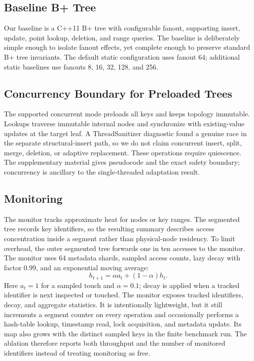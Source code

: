 \documentclass[sigconf,review,anonymous]{acmart}
\begin{document}
\subsection{Baseline B+ Tree}

Our baseline is a C++11 B+ tree with configurable fanout, supporting insert,
update, point lookup, deletion, and range queries.  The baseline is deliberately
simple enough to isolate fanout effects, yet complete enough to preserve
standard B+ tree invariants.  The default static configuration uses fanout 64;
additional static baselines use fanouts 8, 16, 32, 128, and 256.

\subsection{Concurrency Boundary for Preloaded Trees}

The supported concurrent mode preloads all keys and keeps topology immutable.
Lookups traverse immutable internal nodes and synchronize with existing-value
updates at the target leaf.  A ThreadSanitizer diagnostic found a genuine race
in the separate structural-insert path, so we do not claim concurrent insert,
split, merge, deletion, or adaptive replacement.  These operations require
quiescence.  The supplementary material gives pseudocode and the exact safety
boundary; concurrency is ancillary to the single-threaded adaptation result.

\subsection{Monitoring}

The monitor tracks approximate heat for nodes or key ranges.  The segmented
tree records key identifiers, so the resulting summary describes access
concentration inside a segment rather than physical-node residency.  To limit
overhead, the outer segmented tree forwards one in ten accesses to the
monitor.  The monitor uses 64 metadata shards, sampled access counts, lazy
decay with factor 0.99, and an exponential moving average:
\[
  h_{t+1} = \alpha a_t + (1-\alpha)h_t.
\]
Here \(a_t=1\) for a sampled touch and \(\alpha=0.1\); decay is applied when a
tracked identifier is next inspected or touched.  The monitor exposes tracked
identifiers, decay, and aggregate statistics.  It is intentionally
lightweight, but it still increments a segment counter on every operation and
occasionally performs a hash-table lookup, timestamp read, lock acquisition,
and metadata update.  Its map also grows with the distinct sampled keys in the
finite benchmark run.  The ablation therefore reports both throughput and the
number of monitored identifiers instead of treating monitoring as free.
\end{document}
